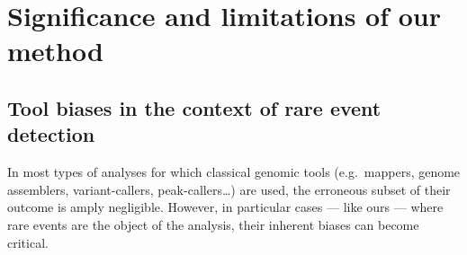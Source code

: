 %
%


\section{Significance and limitations of our method}
\subsection{Tool biases in the context of rare event detection}

In most types of analyses for which classical genomic tools (e.g.\ mappers, genome assemblers, variant-callers, peak-callers…) are used, the erroneous subset of their outcome is amply negligible.
However, in particular cases — like ours — where rare events are the object of the analysis, their inherent biases can become critical.\\

